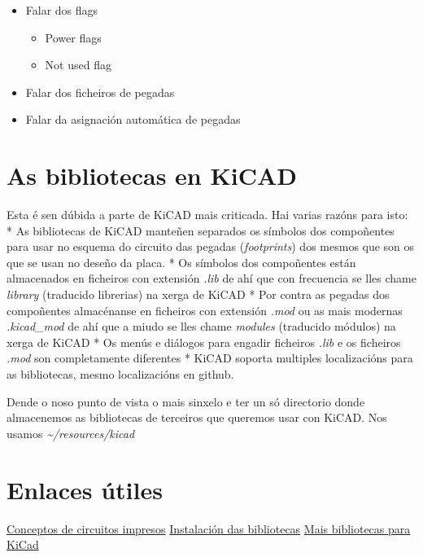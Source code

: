 \begin{itemize}
\itemsep1pt\parskip0pt
\item
  Falar dos flags

  \begin{itemize}
  \itemsep1pt\parskip0pt
  \item
    Power flags
  \item
    Not used flag
  \end{itemize}
\item
  Falar dos ficheiros de pegadas
\item
  Falar da asignación automática de pegadas
\end{itemize}

\section{As bibliotecas en KiCAD}\label{as-bibliotecas-en-kicad}

Esta é sen dúbida a parte de KiCAD mais criticada. Hai varias razóns
para isto: * As bibliotecas de KiCAD manteñen separados os símbolos dos
compoñentes para usar no esquema do circuito das pegadas
(\emph{footprints}) dos mesmos que son os que se usan no deseño da
placa. * Os símbolos dos compoñentes están almacenados en ficheiros con
extensión \emph{.lib} de ahí que con frecuencia se lles chame
\emph{library} (traducido librerias) na xerga de KiCAD * Por contra as
pegadas dos compoñentes almacénanse en ficheiros con extensión
\emph{.mod} ou as mais modernas \emph{.kicad\_mod} de ahí que a miudo se
lles chame \emph{modules} (traducido módulos) na xerga de KiCAD * Os
menús e diálogos para engadir ficheiros \emph{.lib} e os ficheiros
\emph{.mod} son completamente diferentes * KiCAD soporta multiples
localizacións para as bibliotecas, mesmo localizacións en github.

Dende o noso punto de vista o mais sinxelo e ter un só directorio donde
almacenemos as bibliotecas de terceiros que queremos usar con KiCAD. Nos
usamos \emph{\textasciitilde{}/resources/kicad}

\section{Enlaces útiles}\label{enlaces-uxfatiles}

\href{http://www.pcb.electrosoft.cl/04-articulos-circuitos-impresos-desarrollo-sistemas/01-conceptos-circuitos-impresos/conceptos-circuitos-impresos-pcb.html}{Conceptos
de circuitos impresos}
\href{http://www.arunet.co.uk/tkboyd/ele2pcbka.htm}{Instalación das
bibliotecas} \href{http://www.kicadlib.org/}{Mais bibliotecas para
KiCad}

